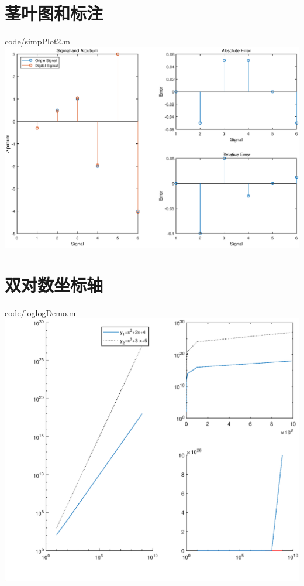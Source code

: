 \documentclass{hfutpaper}
\makeatletter
\newcommand{\figcaption}{\def\@captype{figure}\caption}
\makeatother
\begin{document}
\section*{茎叶图和标注}

{code/simpPlot2.m}
\includegraphics[width=17cm]{figure/stemAndLe}
\figcaption{茎叶图和标注}
\section*{双对数坐标轴}

{code/loglogDemo.m}
\includegraphics[width=18cm]{figure/loglog.eps}
\figcaption{双对数坐标绘图}
\end{document}
